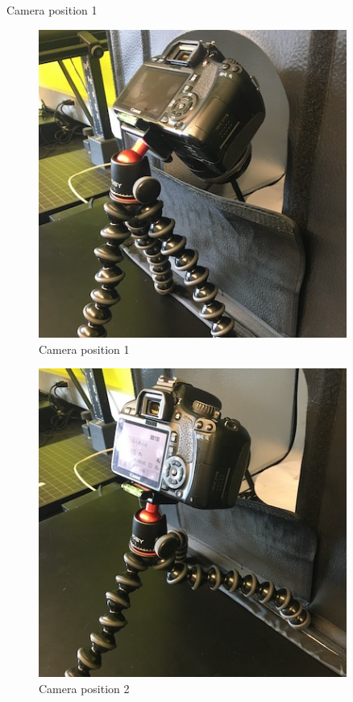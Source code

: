 \documentclass[
]{book}
\begin{document}
Camera position 1

\begin{figure}
\centering
\includegraphics[width=0.9\textwidth,height=\textheight]{Figures/camera_position_1.JPG}
\caption{Camera position 1}
\end{figure}

\begin{figure}
\centering
\includegraphics[width=0.9\textwidth,height=\textheight]{Figures/camera_position_2.JPG}
\caption{Camera position 2}
\end{figure}
\end{document}
